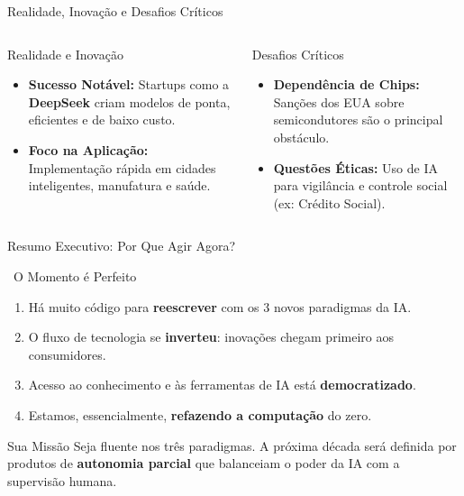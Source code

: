 \documentclass[aspectratio=169,12pt]{beamer}
\begin{document}
\begin{frame}{Realidade, Inovação e Desafios Críticos}
    \begin{columns}[T]
        \begin{column}{0.5\textwidth}
            \begin{exampleblock}{Realidade e Inovação}
                \begin{itemize}
                    \item \textbf{Sucesso Notável:} Startups como a \textbf{DeepSeek} criam modelos de ponta, eficientes e de baixo custo.
                    \item \textbf{Foco na Aplicação:} Implementação rápida em cidades inteligentes, manufatura e saúde.
                \end{itemize}
            \end{exampleblock}
        \end{column}
        
        \begin{column}{0.5\textwidth}
            \begin{alertblock}{Desafios Críticos}
                \begin{itemize}
                    \item \textbf{Dependência de Chips:} Sanções dos EUA sobre semicondutores são o principal obstáculo.
                    \item \textbf{Questões Éticas:} Uso de IA para vigilância e controle social (ex: Crédito Social).
                \end{itemize}
            \end{alertblock}
        \end{column}
    \end{columns}
\end{frame}

\begin{frame}{Resumo Executivo: Por Que Agir Agora?}
    \begin{block}{\faRocket\, O Momento é Perfeito}
        \begin{enumerate}
            \item Há muito código para \textbf{reescrever} com os 3 novos paradigmas da IA.
            \item O fluxo de tecnologia se \textbf{inverteu}: inovações chegam primeiro aos consumidores.
            \item Acesso ao conhecimento e às ferramentas de IA está \textbf{democratizado}.
            \item Estamos, essencialmente, \textbf{refazendo a computação} do zero.
        \end{enumerate}
    \end{block}
    
    \begin{alertblock}{Sua Missão}
        Seja fluente nos três paradigmas. A próxima década será definida por produtos de \textbf{autonomia parcial} que balanceiam o poder da IA com a supervisão humana.
    \end{alertblock}
\end{frame}
\end{document}
